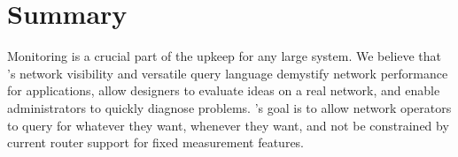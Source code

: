 \section{Summary}
\label{s:pq_summary}
Monitoring is a crucial part of the upkeep for any large system. We believe
that \TheSystem's network visibility and versatile query language demystify
network performance for applications, allow designers to evaluate ideas on a
real network, and enable administrators to quickly diagnose problems.
\TheSystem's goal is to allow network operators to query for whatever they
want, whenever they want, and not be constrained by current router support for
fixed measurement features.
